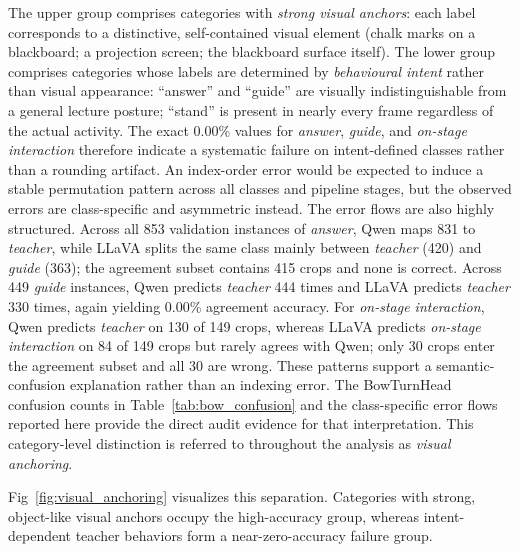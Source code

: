 \documentclass[10pt,letterpaper]{article}
\begin{document}
The upper group comprises categories with \emph{strong visual
anchors}: each label corresponds to a distinctive, self-contained
visual element (chalk marks on a blackboard; a projection screen; the
blackboard surface itself).
The lower group comprises categories whose labels are determined by
\emph{behavioural intent} rather than visual appearance: ``answer''
and ``guide'' are visually indistinguishable from a general lecture
posture; ``stand'' is present in nearly every frame regardless of the
actual activity.
The exact 0.00\% values for \textit{answer}, \textit{guide}, and
\textit{on-stage interaction} therefore indicate a systematic failure
on intent-defined classes rather than a rounding artifact.
An index-order error would be expected to induce a stable permutation
pattern across all classes and pipeline stages, but the observed errors
are class-specific and asymmetric instead.
The error flows are also highly structured. Across all 853 validation
instances of \textit{answer}, Qwen maps 831 to \textit{teacher}, while
LLaVA splits the same class mainly between \textit{teacher} (420) and
\textit{guide} (363); the agreement subset contains 415 crops and none
is correct. Across 449 \textit{guide} instances, Qwen predicts
\textit{teacher} 444 times and LLaVA predicts \textit{teacher} 330
times, again yielding 0.00\% agreement accuracy. For
\textit{on-stage interaction}, Qwen predicts \textit{teacher} on 130 of
149 crops, whereas LLaVA predicts \textit{on-stage interaction} on 84
of 149 crops but rarely agrees with Qwen; only 30 crops enter the
agreement subset and all 30 are wrong. These patterns support a
semantic-confusion explanation rather than an indexing error. The
BowTurnHead confusion counts in Table~\ref{tab:bow_confusion} and the
class-specific error flows reported here provide the direct audit
evidence for that interpretation.
This category-level distinction is referred to throughout the analysis
as \emph{visual anchoring}.

Fig~\ref{fig:visual_anchoring} visualizes this separation. Categories
with strong, object-like visual anchors occupy the high-accuracy group,
whereas intent-dependent teacher behaviors form a near-zero-accuracy
failure group.
\end{document}
